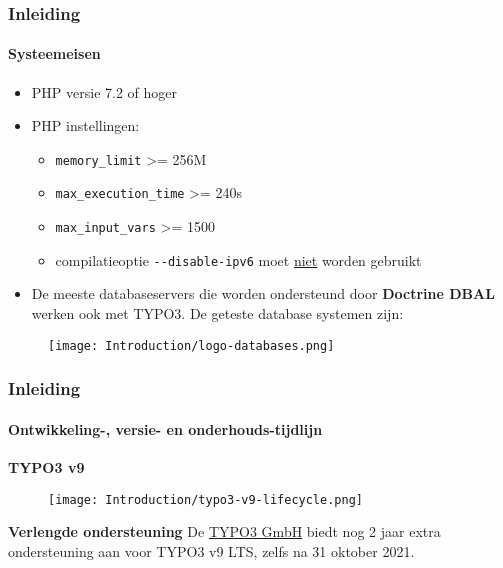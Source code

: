 \begin{frame}[fragile]
	\frametitle{Inleiding}
	\framesubtitle{Systeemeisen}

	\begin{itemize}
		\item PHP versie 7.2 of hoger
		\item PHP instellingen:

			\begin{itemize}
				\item \texttt{memory\_limit} >= 256M
				\item \texttt{max\_execution\_time} >= 240s
				\item \texttt{max\_input\_vars} >= 1500
				\item compilatieoptie \texttt{-}\texttt{-disable-ipv6} moet \underline{niet} worden gebruikt
			\end{itemize}

		\item De meeste databaseservers die worden ondersteund door \textbf{Doctrine DBAL} werken ook met TYPO3.
			De geteste database systemen zijn:
	\end{itemize}

	\begin{figure}
		\texttt{[image: Introduction/logo-databases.png]}
	\end{figure}

\end{frame}


\begin{frame}[fragile]
	\frametitle{Inleiding}
	\framesubtitle{Ontwikkeling-, versie- en onderhouds-tijdlijn}

	\textbf{TYPO3 v9}

	\begin{figure}
		\texttt{[image: Introduction/typo3-v9-lifecycle.png]}
	\end{figure}

	\textbf{Verlengde ondersteuning}\newline
	\smaller
		De \href{https://typo3.com}{TYPO3 GmbH} biedt nog 2 jaar extra ondersteuning aan
		voor TYPO3 v9 LTS, zelfs na 31 oktober 2021.
	\normalsize


\end{frame}

